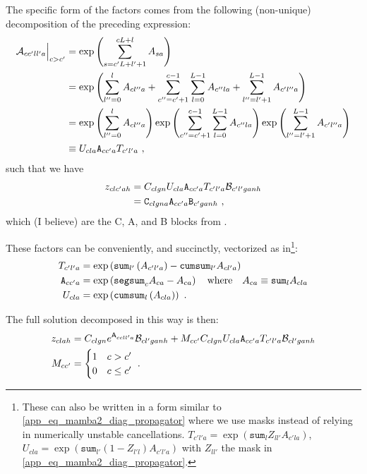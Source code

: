 \documentclass[11pt]{article}
\begin{document}
The specific form of the factors comes from the following (non-unique) decomposition of the
preceding expression:
\begin{align}
    \mathcal{A}_{ cc'll'a }\Big|_{ c>c' } &=\exp \left ( \sum_{ s= c'L + l' + 1 }^{ cL + l  }A _{ sa } \right ) \nonumber\\
                            &= \exp \left (\sum _{ l''=0 }^{ l }A_{ cl''a} +\sum_{ c''=c'+1 }^{ c-1 }\sum_{ l=0 }^{ L-1 }A_{ c''la }  + \sum _{ l''=l'+1 }^{ L-1  }A_{ c'l''a} \right )\nonumber\\
                            &= \exp \left (\sum _{ l''=0 }^{ l }A_{ cl''a}\right ) \exp \left (\sum_{ c''=c'+1 }^{ c-1 }\sum_{ l=0 }^{ L-1 }A_{ c''la }  \right ) \exp \left ( \sum _{ l''=l'+1 }^{ L-1  }A_{ c'l''a} \right ) \nonumber\\
                            &\equiv U_{ cla }\texttt{A}_{ cc'a }T_{ c'l'a }\ ,
\end{align}
such that we have
\begin{align}
z_{ clc'ah }&= C _{ clgn }U_{ cla }\texttt{A}_{ cc'a }T_{ c'l'a }\mathcal{B}_{ c'l'ganh }\nonumber\\
            &= \texttt{C}_{ clgna }\texttt{A}_{ cc'a }\texttt{B}_{ c'ganh }\ ,
\end{align}
which (I believe) are the C, A, and B blocks from \cite{dao2024transformersssmsgeneralizedmodels}.


These factors can be conveniently, and succinctly, vectorized as in\footnote{These can also be written in a form
similar to \eqref{app_eq_mamba2_diag_propagator} where we use masks instead of relying in
numerically unstable cancellations. $ T_{ c'l'a  }= \exp\left (\texttt{sum}_{ l }Z_{ ll' }A_{ c'la
}\right ) $, $ U_{ cla  }= \exp\left (\texttt{sum}_{ l' }\left (1 - Z_{ l'l }\right )A_{ c'l'a  }\right ) $
with $ Z_{ ll' } $ the mask in \eqref{app_eq_mamba2_diag_propagator}.
}:
\begin{align}
    T_{ c'l'a } &=\exp\left ( \texttt{sum}_{ l' }\left ( A_{ c'l'a } \right ) - \texttt{cumsum}_{ l' }A_{ cl'a } \right )\nonumber\\
    \texttt{A}_{ cc'a }&=\exp \left ( \texttt{segsum}_{ c }A_{ ca } - A_{ ca }  \right ) \quad {\rm where}  \quad A_{ ca  }\equiv \texttt{sum}_{ l }A_{ cla  }\nonumber\\
    U_{ cla } &=\exp\left ( \texttt{cumsum}_{ l }\left ( A_{ cla } \right ) \right ) \ .
\end{align}

The full solution decomposed in this way is then:
\begin{align}
    z _{ clah } &= C _{ clgn }e^{ \mathsf{A}_{ ccll'a } }\mathcal{B}_{ cl'ganh } + M_{ cc' }C _{ clgn }U_{ cla }\texttt{A}_{ cc'a }T_{ c'l'a }\mathcal{B}_{ cl'ganh }\nonumber\\
    M_{ cc' } & = \begin{cases}
           1 & c > c'\\
           0 & c \le c'
       \end{cases} \ .
\end{align}
\end{document}
